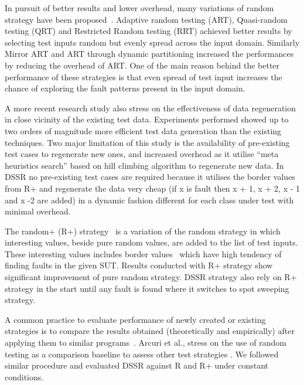 \documentclass{acm_proc_article-sp}
\begin{document}
In pursuit of better results and lower overhead, many variations of random strategy have been proposed~\cite{Chen2010, Chen2005, Chan2002, Chen2004a, Chen2003}. Adaptive random testing (ART), Quasi-random testing (QRT) and Restricted Random testing (RRT) achieved better results by selecting test inputs random but evenly spread across the input domain. Similarly Mirror ART and ART through dynamic partitioning increased the performances by reducing the overhead of ART. One of the main reason behind the better performance of these strategies is that even spread of test input increases the chance of exploring the fault patterns present in the input domain.

A more recent research study \cite{Yoo2012} also stress on the effectiveness of data regeneration in close vicinity of the existing test data. Experiments performed showed up to two orders of magnitude more efficient test data generation than the existing techniques. Two major limitation of this study is the availability of pre-existing test cases to regenerate new ones, and increased overhead as it utilise ``meta heuristics search'' based on hill climbing algorithm to regenerate new data. In DSSR no pre-existing test cases are required because it utilises the border values from R+ and regenerate the data very cheap (if x is fault then x + 1, x + 2, x - 1 and x -2 are added) in a dynamic fashion different for each class under test with minimal overhead. 
  
The random+ (R+) strategy~\cite{Leitner2007} is a variation of the random strategy in which interesting values, beside pure random values, are added to the list of test inputs. These interesting values includes border values~\cite{Beizer1990} which have high tendency of finding faults in the given SUT. Results conducted with R+ strategy show significant improvement of pure random strategy. DSSR strategy also rely on R+ strategy in the start until any fault is found where it switches to spot sweeping strategy.





A common practice to evaluate performance of newly created or existing strategies is to compare the results obtained (theoretically and empirically) after applying them to similar programs~\cite{Gutjahr1999, Duran1984, Hamlet1990}. Arcuri et al., stress on the use of random testing as a comparison baseline to assess other test strategies \cite{Arcuri2012}. We followed similar procedure and evaluated DSSR against R and R+ under constant conditions.
\end{document}
